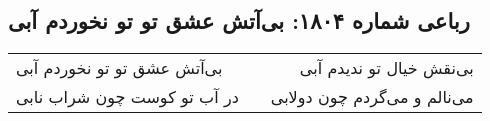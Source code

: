 \begin{center}
\section*{رباعی شماره ۱۸۰۴: بی‌آتش عشق تو تو نخوردم آبی}
\label{sec:1804}
\begin{longtable}{l p{0.5cm} r}
بی‌آتش عشق تو تو نخوردم آبی
&&
بی‌نقش خیال تو ندیدم آبی
\\
در آب تو کوست چون شراب نابی
&&
می‌نالم و می‌گردم چون دولابی
\\
\end{longtable}
\end{center}

